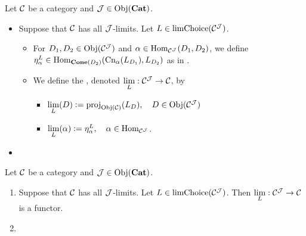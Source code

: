 \documentclass{book}
\begin{document}
\begin{defn} 
	Let $\mathcal{C}$ be a category and $\mathcal{J} \in \operatorname{Obj}(\operatorname*{\text{\textbf{Cat}}})$. 
	\begin{itemize}
		\item Suppose that $\mathcal{C}$ has all $\mathcal{J}$-limits. Let $L \in \operatorname{limChoice}(\mathcal{C}^{\mathcal{J}})$.
		\begin{itemize}
			\item For $D_1, D_2 \in \operatorname{Obj}(\mathcal{C}^{\mathcal{J}})$ and $\alpha \in \operatorname{Hom}_{\mathcal{C}^{\mathcal{J}}}(D_1, D_2)$, we define $\eta^L_{\alpha} \in \operatorname{Hom}_{\operatorname*{\text{\textbf{Cone}}}(D_2)}(\text{Cn}_{\alpha}(L_{D_1}), L_{D_2})$ as in . 
			\item We define the , denoted $\lim\limits_L: \mathcal{C}^{\mathcal{J}} \rightarrow \mathcal{C}$, by
			\begin{itemize}
				\item $\lim\limits_L(D) \vcentcolon= \operatorname{\text{proj}}_{\operatorname{Obj}(\mathcal{C})}(L_D), \quad D \in \operatorname{Obj}(\mathcal{C}^{\mathcal{J}})$ 
				\item $\lim\limits_L(\alpha) \vcentcolon= \eta^L_{\alpha}, \quad \alpha \in \operatorname{Hom}_{\mathcal{C}^{\mathcal{J}}}$.
			\end{itemize}
		\end{itemize}
		\item {}
	\end{itemize}
\end{defn}

\begin{ex} 
	Let $\mathcal{C}$ be a category and $\mathcal{J} \in \operatorname{Obj}(\operatorname*{\text{\textbf{Cat}}})$. 
	\begin{enumerate}
		\item Suppose that $\mathcal{C}$ has all $\mathcal{J}$-limits. Let $L \in \operatorname{limChoice}(\mathcal{C}^{\mathcal{J}})$. Then $\lim\limits_L: \mathcal{C}^{\mathcal{J}} \rightarrow \mathcal{C}$ is a functor.
		\item {}
	\end{enumerate}
\end{ex}
\end{document}
